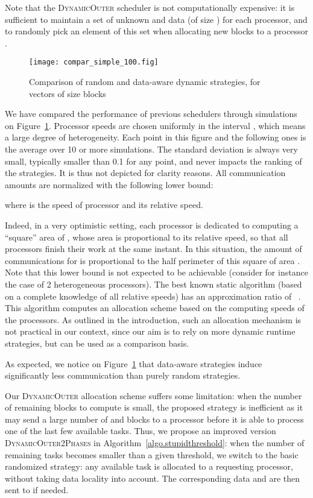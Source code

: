 \documentclass[a4paper,10pt]{article}
\newcommand{\stupid}{\textsc{Dynamic\-Outer}\xspace}
\newcommand{\stupidthreshold}{\textsc{Dynamic\-Outer\-2Phases}\xspace}
\begin{document}
Note that the \stupid scheduler is not computationally expensive: it
is sufficient to maintain a set of unknown  and  data (of size
) for each processor, and to randomly pick an element of this
set when allocating new blocks to a processor . 

\begin{figure}[htbp]
  \centering
  \texttt{[image: compar\_simple\_100.fig]}
  \caption{Comparison of random and data-aware dynamic strategies, for
    vectors of size  blocks}
  \label{fig.rand_vs_data_aware}
\end{figure}

We have compared the performance of previous schedulers through
simulations on Figure~\ref{fig.rand_vs_data_aware}. Processor speeds
are chosen uniformly in the interval , which means a large
degree of heterogeneity. Each point in this figure and the following
ones is the average over 10 or more simulations. The standard
deviation is always very small, typically smaller than 0.1 for any
point, and never impacts the ranking of the strategies. It is thus not
depicted for clarity reasons. All communication amounts are normalized
with the following lower bound:
 
where  is the speed of processor  and  its
relative speed.

Indeed, in a very optimistic setting, each
processor is dedicated to computing a ``square'' area of ,
whose area is proportional to its relative speed, so that all processors finish their work at the same instant. In this situation,
the amount of communications for  is proportional to the half perimeter of this
square of area . Note that this lower bound is not
expected to be achievable (consider for instance the case of 2 heterogeneous processors). The best known static algorithm (based on a complete knowledge of all relative speeds) has an
approximation ratio of ~\cite{algorithmica02}. This algorithm
computes an allocation scheme based on the computing speeds of the
processors. As outlined in
the introduction, such an allocation mechanism is not practical in our
context, since our aim is to rely on more dynamic runtime strategies, but can be used as a  comparison basis.



As expected, we notice on Figure~\ref{fig.rand_vs_data_aware} that
data-aware strategies induce significantly less communication than
purely random strategies.

Our \stupid allocation scheme suffers some limitation: when the number
of remaining blocks to compute is small, the proposed strategy is
inefficient as it may send a large number of  and  blocks to a
processor  before it is able to process one of the last few
available tasks. Thus, we propose an improved version
\stupidthreshold in Algorithm~\ref{algo.stupidthreshold}: when the
number of remaining tasks becomes smaller than a given threshold, we switch to
the basic randomized strategy: any available task  is allocated to a
requesting processor, without taking data locality into account. The
corresponding data  and   are then sent to  if needed.
\end{document}

